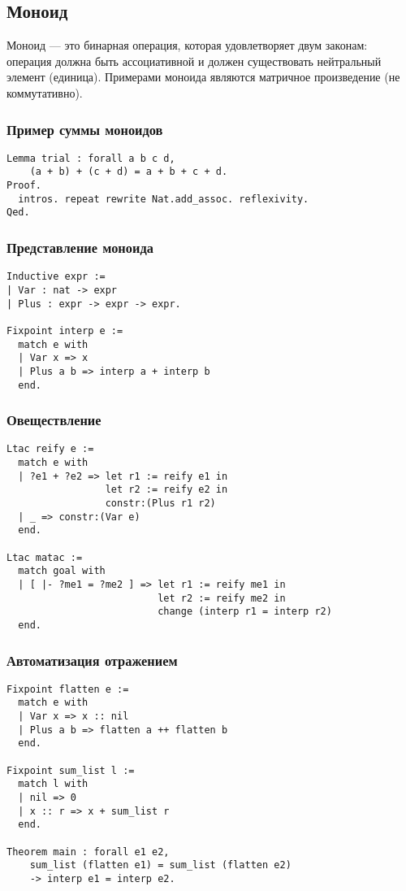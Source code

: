 \documentclass{beamer}
\begin{document}
\begin{frame}
  \section{Моноид}
  Моноид --- это бинарная операция, которая удовлетворяет двум законам: операция должна быть ассоциативной и должен существовать нейтральный элемент (единица). Примерами моноида являются матричное произведение (не коммутативно).
\end{frame}

\begin{frame}[fragile]
  \frametitle{Пример суммы моноидов}
\begin{verbatim}
Lemma trial : forall a b c d,
    (a + b) + (c + d) = a + b + c + d.
Proof.
  intros. repeat rewrite Nat.add_assoc. reflexivity.
Qed.
\end{verbatim}
\end{frame}

\begin{frame}[fragile]
  \frametitle{Представление моноида}
\begin{verbatim}
Inductive expr :=
| Var : nat -> expr
| Plus : expr -> expr -> expr.

Fixpoint interp e :=
  match e with
  | Var x => x
  | Plus a b => interp a + interp b
  end.
\end{verbatim}
\end{frame}

\begin{frame}[fragile]
  \frametitle{Овеществление}
\begin{verbatim}
Ltac reify e :=
  match e with
  | ?e1 + ?e2 => let r1 := reify e1 in
                 let r2 := reify e2 in
                 constr:(Plus r1 r2)
  | _ => constr:(Var e)
  end.

Ltac matac :=
  match goal with
  | [ |- ?me1 = ?me2 ] => let r1 := reify me1 in
                          let r2 := reify me2 in
                          change (interp r1 = interp r2)
  end.
\end{verbatim}
\end{frame}

\begin{frame}[fragile]
  \frametitle{Автоматизация отражением}
  \vspace{-.5em}
\begin{verbatim}
Fixpoint flatten e :=
  match e with
  | Var x => x :: nil
  | Plus a b => flatten a ++ flatten b
  end.

Fixpoint sum_list l :=
  match l with
  | nil => 0
  | x :: r => x + sum_list r
  end.

Theorem main : forall e1 e2,
    sum_list (flatten e1) = sum_list (flatten e2)
    -> interp e1 = interp e2.
\end{verbatim}
\end{frame}
\end{document}
